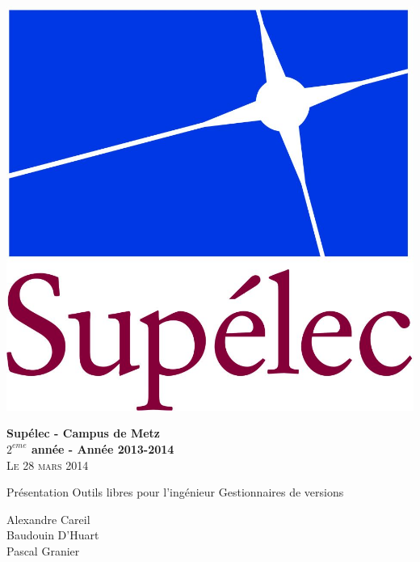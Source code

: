 \begin{minipage}{1\textwidth}
  \centering 

  \begin{flushleft}
    \includegraphics[scale=0.3]{LogoSup.jpg}
    \newline

    \textbf{Supélec - Campus de Metz\\
      $2^{eme}$ année - Année 2013-2014}\\
    \textsc{Le 28 mars 2014}
  \end{flushleft}
  
  \vskip 5cm
  {\LARGE\textsc Présentation Outils libres pour l'ingénieur}
  \vskip 0.5cm
  {\LARGE\textsc Gestionnaires de versions}
  \vskip 5cm

  \Large{Alexandre Careil\\
  Baudouin D'Huart\\
Pascal Granier}
\end{minipage}

